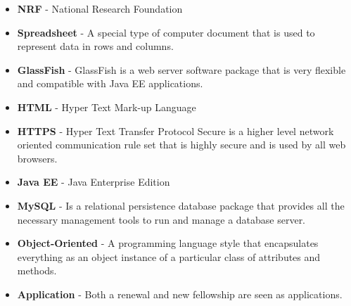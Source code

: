 \documentclass[12pt]{article}
\begin{document}
\begin{itemize}


\item \textbf{NRF} - National Research Foundation
\item \textbf{Spreadsheet} - A special type of computer document that is used to represent data in rows and columns.
\item \textbf{GlassFish} - GlassFish is a web server software package that is very flexible and compatible with Java EE applications. 
\item \textbf{HTML} - Hyper Text Mark-up Language
\item \textbf{HTTPS} - Hyper Text Transfer Protocol Secure is a higher level network oriented communication rule set that is highly secure and is used by all web browsers. 
\item \textbf{Java EE} - Java Enterprise Edition
\item \textbf{MySQL} - Is a relational persistence database package that provides all the necessary management tools to run and manage a database server.
\item \textbf{Object-Oriented} - A programming language style that encapsulates everything as an object instance of a particular class of attributes and methods.
\item \textbf{Application} - Both a renewal and new fellowship are seen as applications.

\end{itemize}	


\vspace{0.5in}
\end{document}
